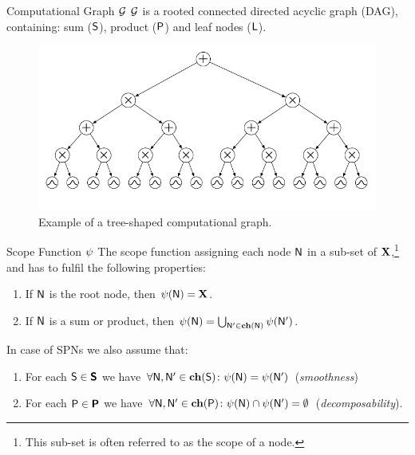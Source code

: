 \begin{frame}{Computational Graph $\mathcal{G}$}
 $\mathcal{G}$ is a rooted connected directed acyclic graph (DAG), containing: sum ($\mathsf{S}$), product ($\mathsf{P}$) and leaf nodes ($\mathsf{L}$).
\begin{figure}
  \includegraphics[width=\textwidth]{computation_graph}
  \caption{Example of a tree-shaped computational graph.}
\end{figure}
\end{frame}

\begin{frame}{Scope Function $\psi$}
The scope function assigning each node $\mathsf{N}$ in a sub-set of $\mathbf{X}$,\footnote{\scriptsize This sub-set is often referred to as the scope of a node.} and has to fulfil the following properties:
\begin{defbox}
\begin{enumerate}
\item If $\mathsf{N}$ is the root node, then $\psi(\mathsf{N}) = \mathbf{X}$.
\item If $\mathsf{N}$ is a sum or product, then $\psi(\mathsf{N}) = \bigcup_{\mathsf{N}' \in \mathbf{ch}(\mathsf{N})} \psi(\mathsf{N}')$.
\end{enumerate}
\end{defbox}
In case of SPNs we also assume that:
\begin{defbox}
\begin{enumerate}
\item For each $\mathsf{S} \in \bm{\mathsf{S}}$ we have $\forall \mathsf{N}, \mathsf{N}' \in \mathbf{ch}(\mathsf{S})\colon \psi(\mathsf{N}) = \psi(\mathsf{N}')$ (\emph{smoothness})
\item For each $\mathsf{P} \in \bm{\mathsf{P}}$ we have $\forall \mathsf{N}, \mathsf{N}' \in \mathbf{ch}(\mathsf{P})\colon \psi(\mathsf{N}) \cap \psi(\mathsf{N}') = \emptyset$ (\emph{decomposability}).
\end{enumerate}
\end{defbox}
\end{frame}

